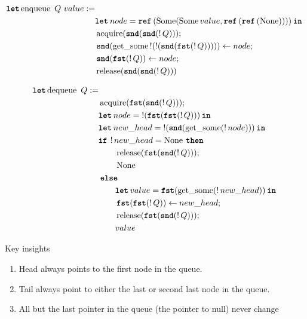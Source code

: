 \documentclass[twoside,11pt,openright]{report}
\newcommand{\acquire}{\operatorname{acquire}}
\newcommand{\release}{\operatorname{release}}
\newcommand{\enqueue}{\operatorname{enqueue}}
\newcommand{\dequeue}{\operatorname{dequeue}}
\newcommand{\getsome}{\operatorname{get\_some}}
\begin{document}
\begin{align*}
  \langkw{let} \enqueue \ Q \ value :=&\\
		& \Let node = \Ref (\Some (\Some value, \Ref(\Ref(\None)))) in\\
		& \acquire (\Snd (\Snd (\deref Q)));\\
		& \Snd (\getsome \deref(\deref(\Snd (\Fst(\deref Q))))) \gets node;\\
		& \Snd (\Fst (\deref Q)) \gets node;\\
		& \release (\Snd (\Snd (\deref Q)))
\end{align*}

\begin{align*}
  \langkw{let} \dequeue \ Q :=&\\ 
		& \acquire (\Fst (\Snd (\deref Q)));\\
		& \Let node = \deref (\Fst (\Fst (\deref Q))) in\\
		& \Let new\_head = \deref (\Snd(\getsome (\deref node))) in\\
		& \If \deref new\_head = \None then\\
			& \hspace{20pt} \release (\Fst (\Snd(\deref Q)));\\
			& \hspace{20pt} \None\\
		& \Else\\
			& \hspace{20pt} \Let value = \Fst (\getsome (\deref new\_head)) in\\
			& \hspace{20pt} \Fst (\Fst (\deref Q)) \gets new\_head;\\
			& \hspace{20pt} \release (\Fst (\Snd (\deref Q)));\\
      & \hspace{20pt} value
\end{align*}



Key insights
\begin{enumerate}
  \item\label{MSQTL:insights:head} Head always points to the first node in the queue.
  \item\label{MSQTL:insights:tail} Tail always point to either the last or second last node in the queue.
  \item\label{MSQTL:insights:persistent} All but the last pointer in the queue (the pointer to null) never change
\end{enumerate}
\end{document}
